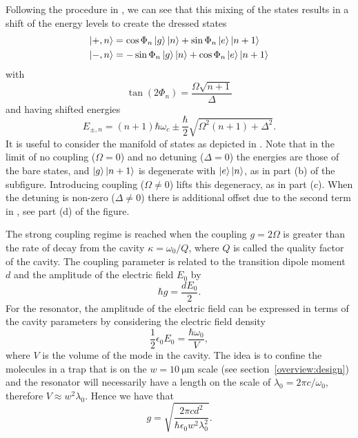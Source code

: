 Following the procedure in , we can see that this
mixing of the states results in a shift of the energy levels to create the
dressed states
%
\begin{align}
  \ket{+, n} &= \cos\Phi_n \ket{g}\ket{n} + \sin\Phi_n \ket{e}\ket{n+1} \\
  \ket{-, n} &= -\sin\Phi_n \ket{g}\ket{n} + \cos\Phi_n \ket{e}\ket{n+1}
\end{align}
%
with
%
\begin{equation}
  \tan(2\Phi_n) = \frac{\Omega\sqrt{n+1}}{\Delta}
\end{equation}
%
and having shifted energies
%
\begin{equation}
  E_{\pm, n} = (n+1)\hbar\omega_c \pm \frac{\hbar}{2}\sqrt{\Omega^2(n+1) +
  \Delta^2}.
  \label{theory:eqn:JCHenergies}
\end{equation}
%
It is useful to consider the manifold of states as depicted in
.  
Note that in the limit of no coupling
($\Omega = 0$) and no detuning ($\Delta = 0$) the energies are those of the
bare states, and $\ket{g}\ket{n+1}$ is degenerate with $\ket{e}\ket{n}$, as in
part (b) of the subfigure. Introducing coupling ($\Omega \neq 0$) lifts this
degeneracy, as in part (c). When the detuning is non-zero ($\Delta \neq 0$)
there is additional offset due to the second term in
, see part (d) of the figure.

The strong coupling regime is reached when the coupling $g=2\Omega$ is
greater than the rate of decay from the cavity $\kappa = \omega_0 / Q$, where
$Q$ is called the quality factor of the cavity. The coupling parameter is
related to the transition dipole moment $d$ and the amplitude of the electric
field $E_0$ by
%
\begin{equation}
  \hbar g = \frac{d E_0}{2}.
\end{equation}
%
For the resonator, the amplitude of the electric field can be expressed in
terms of the cavity parameters by considering the electric field density
%
\begin{equation}
  \frac{1}{2} \epsilon_0 E_0 = \frac{\hbar \omega_0}{V},
\end{equation}
%
where $V$ is the volume of the mode in the cavity. The idea is to confine the
molecules in a trap that is on the $w=\SI{10}{\micro\meter}$ scale (see
section~\ref{overview:design}) and the resonator will necessarily have a length
on the scale of $\lambda_0 = 2\pi c / \omega_0$, therefore $V\approx
w^2\lambda_0$. Hence we have that
%
\begin{equation}
  g = \sqrt{\frac{2\pi c d^2}{\hbar \epsilon_0 w^2 \lambda_0^2}}.
\end{equation}

